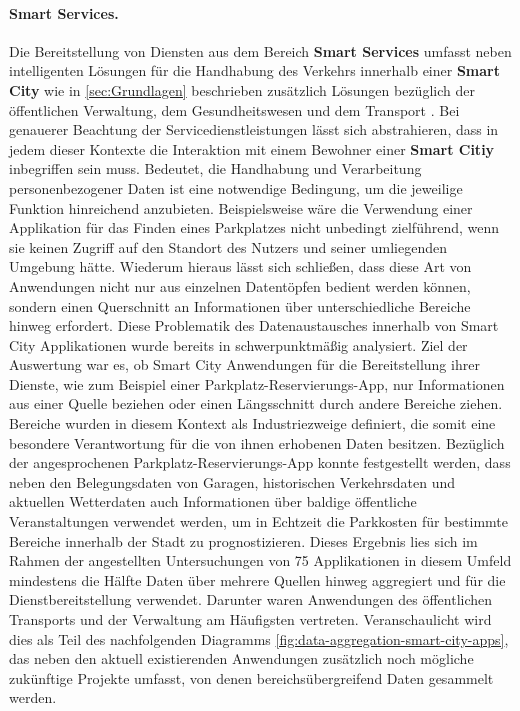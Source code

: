 \paragraph{Smart Services.}
\label{sec:Analyse der Datenerhebung:ssec:Smart City:para:Smart Services}
Die Bereitstellung von Diensten aus dem Bereich \textbf{Smart Services} umfasst neben intelligenten Lösungen für die Handhabung des Verkehrs innerhalb einer \textbf{Smart City} wie in \ref{sec:Grundlagen} beschrieben zusätzlich Lösungen bezüglich der öffentlichen Verwaltung, dem Gesundheitswesen und dem Transport \cite{SecPrivSmartCity2021}. Bei genauerer Beachtung der Servicedienstleistungen lässt sich abstrahieren, dass in jedem dieser Kontexte die Interaktion mit einem Bewohner einer \textbf{Smart Citiy} inbegriffen sein muss. Bedeutet, die Handhabung und Verarbeitung personenbezogener Daten ist eine notwendige Bedingung, um die jeweilige Funktion hinreichend anzubieten. Beispielsweise wäre die Verwendung einer Applikation für das Finden eines Parkplatzes nicht unbedingt zielführend, wenn sie keinen Zugriff auf den Standort des Nutzers und seiner umliegenden Umgebung hätte. Wiederum hieraus lässt sich schließen, dass diese Art von Anwendungen nicht nur aus einzelnen Datentöpfen bedient werden können, sondern einen Querschnitt an Informationen über unterschiedliche Bereiche hinweg erfordert. 
Diese Problematik des Datenaustausches innerhalb von Smart City Applikationen wurde bereits in \cite{BCG2020} schwerpunktmäßig analysiert. Ziel der Auswertung war es, ob Smart City Anwendungen für die Bereitstellung ihrer Dienste, wie zum Beispiel einer Parkplatz-Reservierungs-App, nur Informationen aus einer Quelle beziehen oder einen Längsschnitt durch andere Bereiche ziehen. Bereiche wurden in diesem Kontext als Industriezweige definiert, die somit eine besondere Verantwortung für die von ihnen erhobenen Daten besitzen. Bezüglich der angesprochenen Parkplatz-Reservierungs-App konnte festgestellt werden, dass neben den Belegungsdaten von Garagen, historischen Verkehrsdaten und aktuellen Wetterdaten auch Informationen über baldige öffentliche Veranstaltungen verwendet werden, um in Echtzeit die Parkkosten für bestimmte Bereiche innerhalb der Stadt zu prognostizieren. Dieses Ergebnis lies sich im Rahmen der angestellten Untersuchungen von 75 Applikationen in diesem Umfeld mindestens die Hälfte Daten über mehrere Quellen hinweg aggregiert und für die Dienstbereitstellung verwendet. Darunter waren Anwendungen des öffentlichen Transports und der Verwaltung am Häufigsten vertreten. Veranschaulicht wird dies als Teil des nachfolgenden Diagramms \ref{fig:data-aggregation-smart-city-apps}, das neben den aktuell existierenden Anwendungen zusätzlich noch mögliche zukünftige Projekte umfasst, von denen bereichsübergreifend Daten gesammelt werden.
